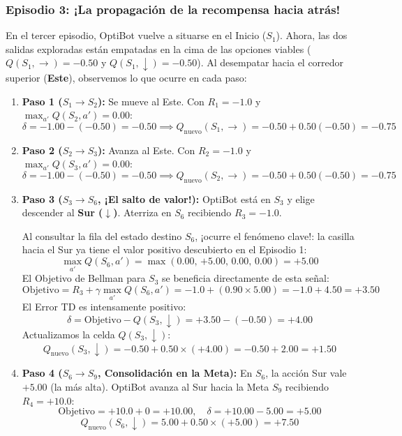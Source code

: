 \begin{calculomanual}
\subsubsection*{Episodio 3: ¡La propagación de la recompensa hacia atrás!}
En el tercer episodio, OptiBot vuelve a situarse en el Inicio ($S_1$). Ahora, las dos salidas exploradas están empatadas en la cima de las opciones viables ($Q(S_1, \rightarrow) = -0.50$ y $Q(S_1, \downarrow) = -0.50$). Al desempatar hacia el corredor superior (\textbf{Este}), observemos lo que ocurre en cada paso:

\begin{enumerate}
  \item \textbf{Paso 1 ($S_1 \to S_2$):} Se mueve al Este. Con $R_1 = -1.0$ y $\max_{a'} Q(S_2, a') = 0.00$:
  \[
    \delta = -1.00 - (-0.50) = -0.50 \implies Q_{\text{nuevo}}(S_1, \rightarrow) = -0.50 + 0.50(-0.50) = \mathbf{-0.75}
  \]
  \item \textbf{Paso 2 ($S_2 \to S_3$):} Avanza al Este. Con $R_2 = -1.0$ y $\max_{a'} Q(S_3, a') = 0.00$:
  \[
    \delta = -1.00 - (-0.50) = -0.50 \implies Q_{\text{nuevo}}(S_2, \rightarrow) = -0.50 + 0.50(-0.50) = \mathbf{-0.75}
  \]
  \item \textbf{Paso 3 ($S_3 \to S_6$, ¡El salto de valor!):} OptiBot está en $S_3$ y elige descender al \textbf{Sur ($\downarrow$)}. Aterriza en $S_6$ recibiendo $R_3 = -1.0$. 
  
  Al consultar la fila del estado destino $S_6$, ¡ocurre el fenómeno clave!: la casilla hacia el Sur ya tiene el valor positivo descubierto en el Episodio 1:
  \[
    \max_{a'} Q(S_6, a') = \max(0.00, \, \mathbf{+5.00}, \, 0.00, \, 0.00) = \mathbf{+5.00}
  \]
  El Objetivo de Bellman para $S_3$ se beneficia directamente de esta señal:
  \[
    \text{Objetivo} = R_3 + \gamma \max_{a'} Q(S_6, a') = -1.0 + (0.90 \times 5.00) = -1.0 + 4.50 = \mathbf{+3.50}
  \]
  El Error TD es intensamente positivo:
  \[
    \delta = \text{Objetivo} - Q(S_3, \downarrow) = +3.50 - (-0.50) = \mathbf{+4.00}
  \]
  Actualizamos la celda $Q(S_3, \downarrow)$:
  \[
    Q_{\text{nuevo}}(S_3, \downarrow) = -0.50 + 0.50 \times (+4.00) = -0.50 + 2.00 = \mathbf{+1.50}
  \]
  \item \textbf{Paso 4 ($S_6 \to S_9$, Consolidación en la Meta):} En $S_6$, la acción Sur vale $+5.00$ (la más alta). OptiBot avanza al Sur hacia la Meta $S_9$ recibiendo $R_4 = +10.0$:
  \[
    \text{Objetivo} = +10.0 + 0 = +10.00, \quad \delta = +10.00 - 5.00 = +5.00
  \]
  \[
    Q_{\text{nuevo}}(S_6, \downarrow) = 5.00 + 0.50 \times (+5.00) = \mathbf{+7.50}
  \]
\end{enumerate}


\end{calculomanual}
